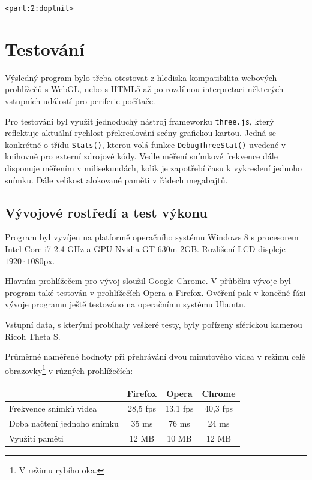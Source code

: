\texttt{<part:2:doplnit>}




\chapter{Testování}
\label{chapter:5}
Výsledný program bylo třeba otestovat z  hlediska kompatibilita webových prohlížečů  s WebGL, nebo s HTML5 až po rozdílnou interpretaci některých vstupních událostí pro periferie počítače. 

Pro testování byl využit jednoduchý nástroj frameworku \texttt{three.js}, který reflektuje aktuální rychlost překreslování scény grafickou kartou. Jedná se konkrétně o třídu \texttt{Stats()}, kterou volá funkce \texttt{DebugThreeStat()} uvedené v knihovně pro externí zdrojové kódy. Vedle měření snímkové frekvence dále disponuje měřením v milisekundách, kolik je zapotřebí času k vykreslení jednoho snímku. Dále velikost alokované paměti v řádech megabajtů.

\section*{Vývojové rostředí a test výkonu}

Program byl vyvíjen na platformě operačního systému Windows 8 s procesorem Intel Core i7 2.4 GHz a GPU Nvidia GT 630m 2GB. Rozlišení LCD displeje $1920 \cdot 1080$px. 

Hlavním prohlížečem pro vývoj sloužil Google Chrome. V přůběhu vývoje byl program také testován v prohlížečích Opera a Firefox. Ověření pak v konečné fázi vývoje programu ještě testováno na operačnímu systému Ubuntu.

Vstupní data, s kterými probíhaly veškeré testy, byly pořízeny sférickou kamerou Ricoh Theta S.

Průměrné naměřené hodnoty při přehrávání dvou minutového videa v režimu celé obrazovky\footnote{V režimu rybího oka.} v různých prohlížečích: 

\begin{center}
	\begin{tabular}{ l | c| c| c  } 
		& \textbf{Firefox} & \textbf{Opera}  & \textbf{Chrome}   \\ 
 		\hline
		Frekvence snímků videa & 28,5 fps & 13,1 fps & 40,3 fps    \\ 
		\hline
		Doba načtení jednoho snímku  & 35 ms & 76 ms & 24 ms  \\ 
		\hline
		Využití paměti & 12  MB & 10  MB & 12  MB   \\ 
		
	\end{tabular}
\end{center}

